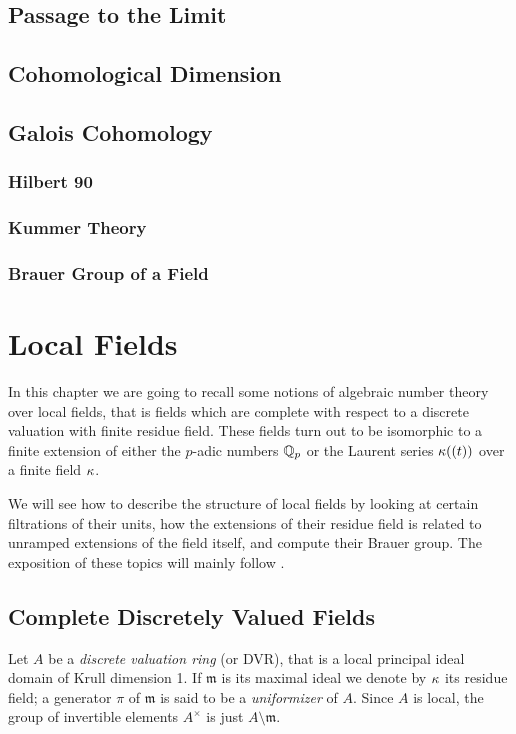 \documentclass[a4paper, oneside]{memoir}
\begin{document}
\section{Passage to the Limit}
\section{Cohomological Dimension}
\section{Galois Cohomology}
\subsection{Hilbert 90}
\subsection{Kummer Theory}
\subsection{Brauer Group of a Field}

\chapter{Local Fields}
In this chapter we are going to recall some notions of algebraic number theory over local fields, that is fields which are complete with respect to a discrete valuation with finite
residue field. These fields turn out to be isomorphic to a finite extension of either the $p$-adic numbers $\mathbb{Q}_p$ or the Laurent series $\kappa((t))$ over a finite field $\kappa$.

We will see how to describe the structure of local fields by looking at certain filtrations of their units, how the extensions of their residue field is related to unramped
extensions of the field itself, and compute their Brauer group. The exposition of these topics will mainly follow \cite{SerreCL}.

\section{Complete Discretely Valued Fields}
Let $A$ be a \textit{discrete valuation ring} (or DVR), that is a local principal ideal domain of Krull dimension 1. If $\mathfrak{m}$ is its maximal ideal we denote by $\kappa$ its
residue field; a generator $\pi$ of $\mathfrak{m}$ is said to be a \textit{uniformizer} of $A$. Since $A$ is local, the group of invertible elements $A^\times$ is just
$A\setminus\mathfrak{m}$.
\end{document}
